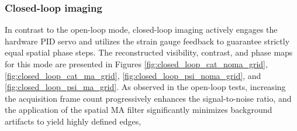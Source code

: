 \documentclass[12pt,a4paper]{article}
\begin{document}
        \subsubsection{Closed-loop imaging}
        In contrast to the open-loop mode, closed-loop imaging actively engages the hardware PID servo and utilizes the strain gauge feedback to guarantee strictly equal spatial phase steps. The reconstructed visibility, contrast, and phase maps for this mode are presented in Figures \ref{fig:closed_loop_cat_noma_grid}, \ref{fig:closed_loop_cat_ma_grid}, \ref{fig:closed_loop_psi_noma_grid}, and \ref{fig:closed_loop_psi_ma_grid}. As observed in the open-loop tests, increasing the acquisition frame count progressively enhances the signal-to-noise ratio, and the application of the spatial \ac{MA} filter significantly minimizes background artifacts to yield highly defined edges,  
        
\end{document}
